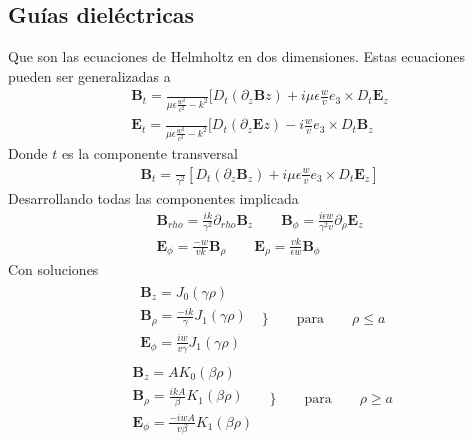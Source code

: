 \subsection{Guías dieléctricas}
Que son las ecuaciones de Helmholtz en dos dimensiones. Estas ecuaciones pueden ser generalizadas a
\begin{subequations}
	\begin{align}
	\mathbf{B}_{t}=\frac{}{\mu \epsilon\frac{w^2}{c^2}-k^2}[D_{t} (\partial_{z} \mathbf{B}{z})+i\mu\epsilon\frac{w}{v}e_{3}\times D_{t}\mathbf{E}_{z} \\
	\mathbf{E}_{t}=\frac{}{\mu \epsilon\frac{w^2}{c^2}-k^2}[D_{t} (\partial_{z} \mathbf{E}{z})-i\frac{w}{v}e_{3}\times D_{t}\mathbf{B}_{z} 
	\end{align}
	\end{subequations}
Donde $t$ es la componente transversal
\begin{subequations}
	\begin{align}
	\mathbf{B}_{t}=\frac{}{\gamma^2} [D_{t}(\partial_{z}\mathbf{B}_{z})+i\mu \epsilon \frac{w}{v} e_{3}\times D_{t}\mathbf{E}_{z}]
	\end{align}
\end{subequations}
Desarrollando todas las componentes implicada
\begin{subequations}
	\begin{align}
\mathbf{B}_{rho} = \frac{ik}{\gamma^2}\partial_{rho}\mathbf{B}_{z} \qquad \mathbf{B}_{\phi} = \frac{i \epsilon w}{\gamma^2 v} \partial_{\rho} \mathbf{E}_{z}\\
\mathbf{E}_{\phi} = \frac{-w}{v k }\mathbf{B}_{\rho} \qquad \mathbf{E}_{\rho} = \frac{v k}{\epsilon w} \mathbf{B}_{\phi}
	\end{align}
\end{subequations}
Con soluciones 
\begin{eqnarray}
	\begin{array}{ll}
		\mathbf{B}_{z} = J_{0}(\gamma \rho) \qquad \nonumber \\
		\mathbf{B}_{\rho } = \frac{-i k}{\gamma} J_{1} (\gamma \rho) \nonumber \\
		\mathbf{E}_{\phi} = \frac{i w}{v \gamma} J_{1} (\gamma \rho)
		\end{array} \Bigg\} \qquad \text{para}  \qquad \rho \leq a 
\end{eqnarray}
\begin{eqnarray}
\begin{array}{ll}
\mathbf{B}_{z} = A K_{0}(\beta \rho) \qquad \nonumber \\
\mathbf{B}_{\rho } = \frac{i k A}{\beta} K_{1} (\beta \rho) \nonumber \\
\mathbf{E}_{\phi} = \frac{-i w A}{v \beta} K_{1} (\beta \rho)
\end{array}  \Bigg\} \qquad \text{para}  \qquad \rho \geq a 
\end{eqnarray}
